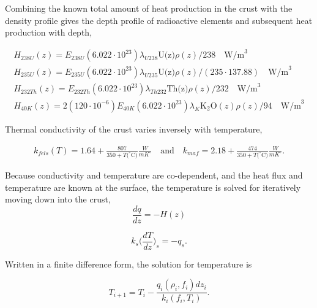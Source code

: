 \documentclass[a4paper,10pt]{article}
\begin{document}
\noindent Combining the known total amount of heat production in the crust with the density profile gives the depth profile of radioactive elements and subsequent heat production with depth, 

\begin{eqnarray}
H_{238U}(z)=E_{238U}(6.022\cdot 10^{23})\lambda_{U238}\text{U(z)}\rho(z)/238 \quad  \text{W/m}^3\\
H_{235U}(z)=E_{235U}(6.022\cdot 10^{23})\lambda_{U235}\text{U(z)}\rho(z)/(235\cdot 137.88)  \quad \text{W/m}^3\\
H_{232Th}(z)=E_{232Th}(6.022\cdot 10^{23})\lambda_{Th232}\text{Th(z)}\rho(z)/232 \quad  \text{W/m}^3\\
H_{40K}(z)=2(120\cdot 10^{-6})E_{40K}(6.022\cdot 10^{23})\lambda_{K}\text{K$_2$O}(z)\rho(z)/94 \quad  \text{W/m}^3
\end{eqnarray}

\noindent Thermal conductivity of the crust varies inversely with temperature, 

\begin{eqnarray}
k_{fels}(T)=1.64+\frac{807}{350+T(^{\circ}\text{C)}} \frac{W}{mK^{\circ}} \quad \text{and} \quad k_{maf}=2.18+\frac{474}{350+T(^{\circ}\text{C)}}  \frac{W}{mK^{\circ}}.
\end{eqnarray}

\noindent Because conductivity and temperature are co-dependent, and the heat flux and temperature are known at the surface, the temperature is solved for iteratively moving down into the crust, 
\begin{equation}
\frac{dq}{dz}=-H(z) 
\end{equation}

\begin{equation}
k_s\Big(\frac{dT}{dz}\Big)_{s}=-q_s.
\end{equation}

\noindent Written in a finite difference form, the solution for temperature is 

\begin{equation}
T_{i+1}=T_i-\frac{q_i(\rho_i,f_i)dz_i}{k_i(f_i,T_i)}.
\end{equation}
\end{document}
